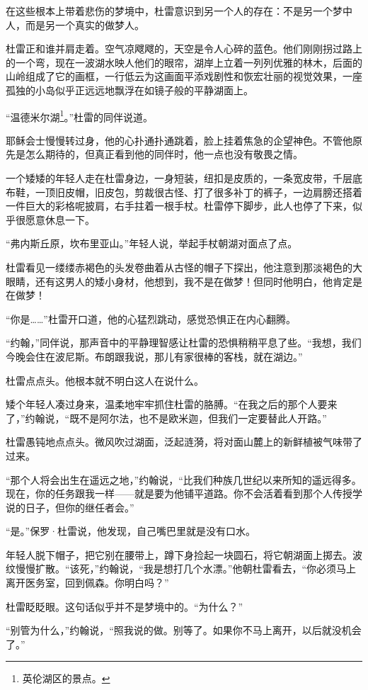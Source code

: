 \documentclass[AutoFakeBold=true]{book}
\begin{document}
在这些根本上带着悲伤的梦境中，杜雷意识到另一个人的存在：不是另一个梦中人，而是另一个真实的做梦人。

杜雷正和谁并肩走着。空气凉飕飕的，天空是令人心碎的蓝色。他们刚刚拐过路上的一个弯，现在一波湖水映人他们的眼帘，湖岸上立着一列列优雅的林木，后面的山岭组成了它的画框，一行低云为这画面平添戏剧性和恢宏壮丽的视觉效果，一座孤独的小岛似乎正远远地飘浮在如镜子般的平静湖面上。

``温德米尔湖\footnote{英伦湖区的景点。}。''杜雷的同伴说道。

耶稣会士慢慢转过身，他的心扑通扑通跳着，脸上挂着焦急的企望神色。不管他原先是怎么期待的，但真正看到他的同伴时，他一点也没有敬畏之情。

一个矮矮的年轻人走在杜雷身边，一身短装，纽扣是皮质的，一条宽皮带，千层底布鞋，一顶旧皮帽，旧皮包，剪裁很古怪、打了很多补丁的裤子，一边肩膀还搭着一件巨大的彩格呢披肩，右手拄着一根手杖。杜雷停下脚步，此人也停了下来，似乎很愿意休息一下。

``弗内斯丘原，坎布里亚山。''年轻人说，举起手杖朝湖对面点了点。

杜雷看见一缕缕赤褐色的头发卷曲着从古怪的帽子下探出，他注意到那淡褐色的大眼睛，还有这男人的矮小身材，他想到，我不是在做梦！但同时他明白，他肯定是在做梦！

``你是……''杜雷开口道，他的心猛烈跳动，感觉恐惧正在内心翻腾。

``约翰，''同伴说，那声音中的平静理智感让杜雷的恐惧稍稍平息了些。``我想，我们今晚会住在波尼斯。布朗跟我说，那儿有家很棒的客栈，就在湖边。''

杜雷点点头。他根本就不明白这人在说什么。

矮个年轻人凑过身来，温柔地牢牢抓住杜雷的胳膊。``在我之后的那个人要来了，''约翰说，``既不是阿尔法，也不是欧米迦，但我们一定要替此人开路。''

杜雷愚钝地点点头。微风吹过湖面，泛起涟漪，将对面山麓上的新鲜植被气味带了过来。

``那个人将会出生在遥远之地，''约翰说，``比我们种族几世纪以来所知的遥远得多。现在，你的任务跟我一样——就是要为他铺平道路。你不会活着看到那个人传授学说的日子，但你的继任者会。''

``是。''保罗·杜雷说，他发现，自己嘴巴里就是没有口水。

年轻人脱下帽子，把它别在腰带上，蹲下身捡起一块圆石，将它朝湖面上掷去。波纹慢慢扩散。``该死，''约翰说，``我是想打几个水漂。''他朝杜雷看去，``你必须马上离开医务室，回到佩森。你明白吗？''

杜雷眨眨眼。这句话似乎并不是梦境中的。``为什么？''

``别管为什么，''约翰说，``照我说的做。别等了。如果你不马上离开，以后就没机会了。''
\end{document}
